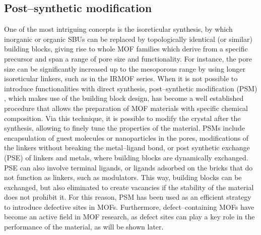 \subsection*{Post--synthetic modification}
One of the most intriguing concepts is the isoreticular synthesis, by which inorganic or organic SBUs can be replaced by topologically identical (or similar) building blocks, giving rise to whole MOF families which derive from a specific precursor and span a range of pore size and functionality. For instance, the pore size can be significantly increased up to the mesoporous range by using longer isoreticular linkers, such as in the IRMOF series\cite{eddaoudi2002systematic}. When it is not possible to introduce functionalities with direct synthesis, post--synthetic modification (PSM) \cite{wang2009postsynthetic}, which makes use of the building block design, has become a well established procedure that allows the preparation of MOF materials with specific chemical composition. 
Via this technique, it is possible to modify the crystal after the synthesis, allowing to finely tune the properties of the material. PSMs include encapsulation of guest molecules or nanoparticles in the pores, modifications of the linkers without breaking the metal--ligand bond, or post synthetic exchange (PSE) of linkers and metals, where building blocks are dynamically exchanged. 
PSE can also involve terminal ligands, or ligands adsorbed on the bricks that do not function as linkers, such as modulators. This way, building blocks can be exchanged, but also eliminated to create vacancies if the stability of the material does not prohibit it. For this reason, PSM has been used as an efficient strategy to introduce defective sites in MOFs. Furthermore, defect--containing MOFs have become an active field in MOF research, as defect sites can play a key role in the performance of the material, as will be shown later. 

